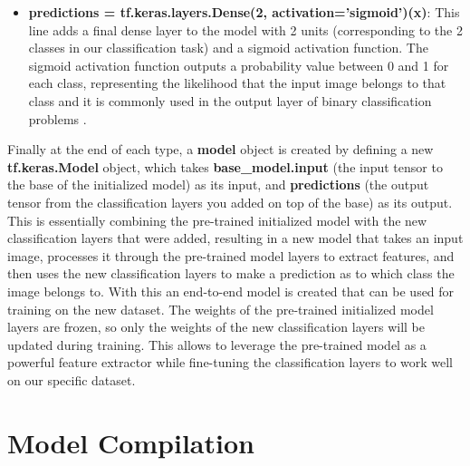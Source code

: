 \begin{itemize}
    \item \textbf{predictions = tf.keras.layers.Dense(2, activation='sigmoid')(x)}: This line adds a final dense layer to the model with 2 units (corresponding to the 2 classes in our classification task) and a sigmoid activation function. The sigmoid activation function outputs a probability value between 0 and 1 for each class, representing the likelihood that the input image belongs to that class and it is commonly used in the output layer of binary classification problems \cite{sharma2017activation}.
\end{itemize}


Finally at the end of each type, a \textbf{model} object is created by defining a new \textbf{tf.keras.Model} object, which takes \textbf{base\_model.input} (the input tensor to the base of the initialized model) as its input, and \textbf{predictions} (the output tensor from the classification layers you added on top of the base) as its output. This is essentially combining the pre-trained initialized model with the new classification layers that were added, resulting in a new model that takes an input image, processes it through the pre-trained model layers to extract features, and then uses the new classification layers to make a prediction as to which class the image belongs to. With this an end-to-end model is created that can be used for training on the new dataset. The weights of the pre-trained initialized model layers are frozen, so only the weights of the new classification layers will be updated during training. This allows to leverage the pre-trained model as a powerful feature extractor while fine-tuning the classification layers to work well on our specific dataset.


\section{Model Compilation}

